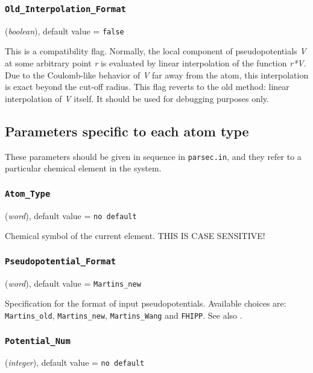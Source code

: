 \documentclass{article}
\begin{document}
\subsubsection{\tt Old\_Interpolation\_Format 
\label{OldInterpolationFormat}}
({\it boolean}),
default value = {\tt false }

This is a compatibility flag. Normally, the local component of pseudopotentials
{\it V} at some arbitrary point {\it r} is evaluated by linear interpolation of the
function {\it r*V}. Due to the Coulomb-like behavior of {\it V} far away from
the atom, this interpolation is exact beyond the cut-off radius. This
flag reverts to the old method: linear interpolation of {\it V} itself.
It should be used for debugging purposes only.








\subsection{Parameters specific to each atom type}

These parameters should be given in sequence in {\tt parsec.in}, and
they refer to a particular chemical element in the system.

\subsubsection{\tt Atom\_Type 
\label{AtomType}}
({\it word}),
default value = {\tt no default }

Chemical symbol of the current element. THIS IS CASE SENSITIVE!

\subsubsection{\tt Pseudopotential\_Format 
\label{PseudopotentialFormat}}
({\it word}),
default value = {\tt Martins\_new }

Specification for the format of input pseudopotentials. Available
choices are: {\tt Martins\_old}, {\tt Martins\_new}, {\tt Martins\_Wang}
and {\tt FHIPP}. See also .

\subsubsection{\tt Potential\_Num 
\label{PotentialNum}}
({\it integer}),
default value = {\tt no default }
\end{document}
